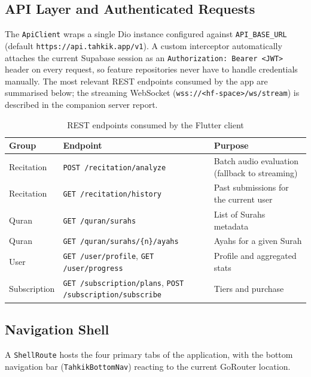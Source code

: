 \subsection{API Layer and Authenticated Requests}

The \texttt{ApiClient} wraps a single Dio instance configured against \texttt{API\_BASE\_URL} (default \texttt{https://api.tahkik.app/v1}). A custom interceptor automatically attaches the current Supabase session as an \texttt{Authorization: Bearer <JWT>} header on every request, so feature repositories never have to handle credentials manually. The most relevant REST endpoints consumed by the app are summarised below; the streaming WebSocket (\texttt{wss://<hf-space>/ws/stream}) is described in the companion server report.

\begin{table}[H]
  \centering
  \caption{REST endpoints consumed by the Flutter client}
  \label{tab:impl_app_endpoints}
  \renewcommand{\arraystretch}{1.3}
  \begin{tabular}{llp{6.5cm}}
    \toprule
    \textbf{Group} & \textbf{Endpoint} & \textbf{Purpose} \\
    \midrule
    Recitation & \texttt{POST /recitation/analyze} & Batch audio evaluation (fallback to streaming) \\
    Recitation & \texttt{GET /recitation/history}  & Past submissions for the current user \\
    Quran      & \texttt{GET /quran/surahs}        & List of Surahs metadata \\
    Quran      & \texttt{GET /quran/surahs/\{n\}/ayahs} & Ayahs for a given Surah \\
    User       & \texttt{GET /user/profile}, \texttt{GET /user/progress} & Profile and aggregated stats \\
    Subscription & \texttt{GET /subscription/plans}, \texttt{POST /subscription/subscribe} & Tiers and purchase \\
    \bottomrule
  \end{tabular}
\end{table}

\subsection{Navigation Shell}

A \texttt{ShellRoute} hosts the four primary tabs of the application, with the bottom navigation bar (\texttt{TahkikBottomNav}) reacting to the current GoRouter location.


